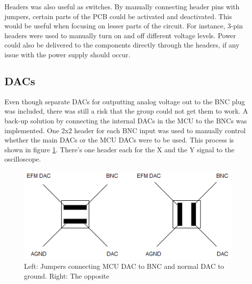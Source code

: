 Headers was also useful as switches. 
By manually connecting header pins with jumpers, certain parts of the PCB could be activated and deactivated. 
This would be useful when focusing on lesser parts of the circuit. 
For instance, 3-pin headers were used to manually turn on and off different voltage levels. 
Power could also be delivered to the components directly through the headers, if any issue with the power supply should occur.

\subsection{DACs}
Even though separate DACs for outputting analog voltage out to the BNC plug was included, there was still a risk that the group could not get them to work. 
A back-up solution by connecting the internal DACs in the MCU to the BNCs was implemented. 
One 2x2 header for each BNC input was used to manually control whether the main DACs or the MCU DACs were to be used. 
This process is shown in figure \ref{fig:DAC headers}. 
There's one header each for the X and the Y signal to the oscilloscope. 

\begin{figure}[h!]
\centering
\includegraphics[scale = 0.6]{images/DAC_headers.png}
\caption{Left: Jumpers connecting MCU DAC to BNC and normal DAC to ground.
         Right: The opposite}
\label{fig:DAC headers}
\end{figure}

